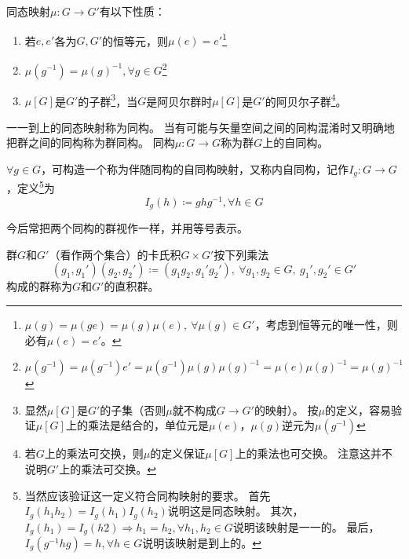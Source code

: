 \begin{theorem}
    同态映射$\mu \colon G \to G'$有以下性质：
    \begin{enumerate}[（a）]
        \item 若$e, e'$各为$G, G'$的恒等元，则$\mu(e) = e'$\footnote{
            $\mu(g) = \mu(ge) = \mu(g)\mu(e), ~ \forall \mu(g) \in G'$，考虑到恒等元的唯一性，则必有$\mu(e) = e'$。
        }
        \item $\mu(g^{-1}) = \mu(g)^{-1}, \forall g \in G$\footnote{
            $\mu(g^{-1}) = \mu(g^{-1})e' = \mu(g^{-1})\mu(g)\mu(g)^{-1} = \mu(e)\mu(g)^{-1} = \mu(g)^{-1}$
        }
        \item $\mu[G]$是$G'$的子群\footnote{
            显然$\mu[G]$是$G'$的子集（否则$\mu$就不构成$G \to G'$的映射）。
            按$\mu$的定义，容易验证$\mu[G]$上的乘法是结合的，单位元是$\mu(e)$，$\mu(g)$逆元为$\mu(g^{-1})$
        }，当$G$是阿贝尔群时$\mu[G]$是$G'$的阿贝尔子群\footnote{
            若$G$上的乘法可交换，则$\mu$的定义保证$\mu[G]$上的乘法也可交换。
            注意这并不说明$G'$上的乘法可交换。
        }。
    \end{enumerate}
\end{theorem}

\begin{definition}
    一一到上的同态映射称为同构。
    当有可能与矢量空间之间的同构混淆时又明确地把群之间的同构称为群同构。
    同构$\mu \colon G \to G$称为群$G$上的自同构。
\end{definition}

\begin{example}
    $\forall g \in G$，可构造一个称为伴随同构的自同构映射，又称内自同构，记作$I_g \colon G \to G$，定义\footnote{
        当然应该验证这一定义符合同构映射的要求。
        首先$I_g(h_1h_2) = I_g(h_1)I_g(h_2)$说明这是同态映射。
        其次，$I_g(h_1) = I_g(h2) \Rightarrow h_1 = h_2, \forall h_1, h_2 \in G$说明该映射是一一的。
        最后，$I_g(g^{-1}hg) = h, \forall h \in G$说明该映射是到上的。
    }为$$I_g(h) \coloneq ghg^{-1}, \forall h \in G$$
\end{example}

\begin{note}
    今后常把两个同构的群视作一样，并用等号表示。
\end{note}

\begin{definition}
    群$G$和$G'$（看作两个集合）的卡氏积$G \times G'$按下列乘法
    $$(g_1, g_1')(g_2, g_2') \coloneq (g_1g_2, g_1'g_2'), ~ \forall g_1, g_2 \in G, ~ g_1',g_2' \in G'$$
    构成的群称为$G$和$G'$的直积群。
\end{definition}

